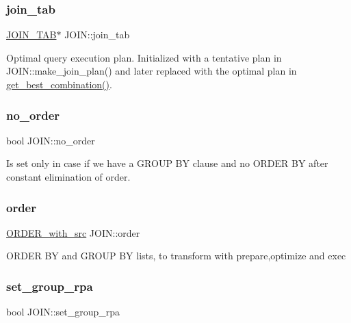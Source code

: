 \subsubsection{\texorpdfstring{join\+\_\+tab}{join\_tab}}
{\footnotesize\ttfamily \mbox{\hyperlink{classJOIN__TAB}{J\+O\+I\+N\+\_\+\+T\+AB}}$\ast$ J\+O\+I\+N\+::join\+\_\+tab}

Optimal query execution plan. Initialized with a tentative plan in J\+O\+I\+N\+::make\+\_\+join\+\_\+plan() and later replaced with the optimal plan in \mbox{\hyperlink{group__Query__Optimizer_gae9c1cf0874f4bda777557d012148e059}{get\+\_\+best\+\_\+combination()}}. \mbox{\label{classJOIN_a344b18fe9de3b8ca73352e0f662595f8}} 
\subsubsection{\texorpdfstring{no\+\_\+order}{no\_order}}
{\footnotesize\ttfamily bool J\+O\+I\+N\+::no\+\_\+order}

Is set only in case if we have a G\+R\+O\+UP BY clause and no O\+R\+D\+ER BY after constant elimination of \textquotesingle{}order\textquotesingle{}. \mbox{\label{classJOIN_ac06839682aae707b0e1d4fafd53abaf5}} 
\subsubsection{\texorpdfstring{order}{order}}
{\footnotesize\ttfamily \mbox{\hyperlink{classJOIN_1_1ORDER__with__src}{O\+R\+D\+E\+R\+\_\+with\+\_\+src}} J\+O\+I\+N\+::order}

O\+R\+D\+ER BY and G\+R\+O\+UP BY lists, to transform with prepare,optimize and exec \mbox{\label{classJOIN_aaf4e8ed1fc6de12c4faeb43fd31439c3}} 
\subsubsection{\texorpdfstring{set\+\_\+group\+\_\+rpa}{set\_group\_rpa}}
{\footnotesize\ttfamily bool J\+O\+I\+N\+::set\+\_\+group\+\_\+rpa}

